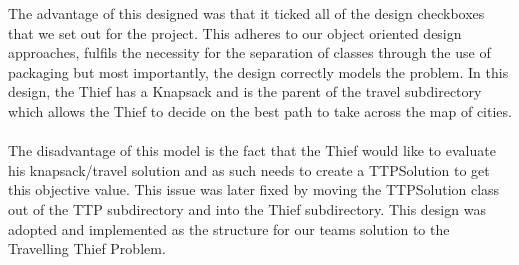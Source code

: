 \documentclass[a4paper,12pt]{article}
\begin{document}
The advantage of this designed was that it ticked all of the design checkboxes that we set out for the project. This adheres to our object oriented design approaches, fulfils the necessity for the separation of classes through the use of packaging but most importantly, the design correctly models the problem. In this design, the Thief has a Knapsack and is the parent of the travel subdirectory which allows the Thief to decide on the best path to take across the map of cities.\\
\\
The disadvantage of this model is the fact that the Thief would like to evaluate his knapsack/travel solution and as such needs to create a TTPSolution to get this objective value. This issue was later fixed by moving the TTPSolution class out of the TTP subdirectory and into the Thief subdirectory. This design was adopted and implemented as the structure for our teams solution to the Travelling Thief Problem.
\end{document}
